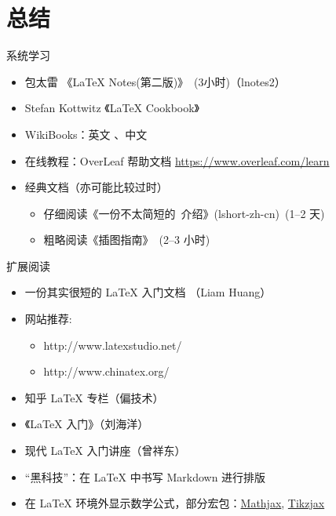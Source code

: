 
\section{总结}

\begin{frame}{系统学习}
  \begin{itemize}
      \item 包太雷 《\LaTeX{} Notes(第二版)》~(3小时)（lnotes2） 
      \item Stefan Kottwitz 《LaTeX Cookbook》
      \item WikiBooks：英文 、中文 
      \item 在线教程：OverLeaf 帮助文档 \url{https://www.overleaf.com/learn}
      \item 经典文档（亦可能比较过时）
        \begin{itemize}
          \item 仔细阅读《一份不太简短的~\LaTeXe 介绍》(lshort-zh-cn)~(1--2 天)
          \item 粗略阅读《\LaTeXe 插图指南》~(2--3 小时)
        \end{itemize}
  \end{itemize}
\end{frame}

\begin{frame}{扩展阅读}
  \begin{itemize}
    \item 一份其实很短的 \LaTeX{} 入门文档 （Liam Huang） 
    \item 网站推荐:
      \begin{itemize}
        \item http://www.latexstudio.net/
        \item http://www.chinatex.org/
      \end{itemize}
    \item 知乎 \LaTeX{} 专栏（偏技术）
    \item 《\LaTeX{} 入门》（刘海洋）
    \item 现代 \LaTeX{} 入门讲座（曾祥东）
    \item “黑科技”：在 \LaTeX{} 中书写 Markdown 进行排版 
    \item 在 \LaTeX{} 环境外显示数学公式，部分宏包：\href{https://www.mathjax.org/}{Mathjax}, \href{https://github.com/kisonecat/tikzjax}{Tikzjax}

  \end{itemize}
\end{frame}

